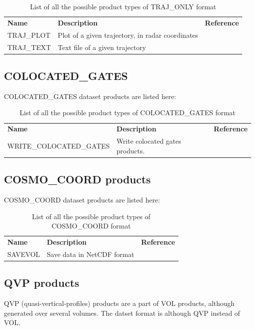 \documentclass[a4paper,11pt,pdftex,twoside]{scrartcl}
\renewcommand{\bf}{\normalfont \bfseries}
\begin{document}
{{{\begin{table}[H]
\begin{tabularx}{\textwidth}{lXl}
{\bf Name} & {\bf Description} & {\bf Reference}\\
 TRAJ\_PLOT & Plot of a given trajectory, in radar coordinates &  \\
 TRAJ\_TEXT & Text file of  a given trajectory &  \\
 

\end{tabularx}
\caption{List of all the possible product types of TRAJ\_ONLY format}
\label{tab_products_TRAJ_ONLY}
\end{table}

\subsection{COLOCATED\_GATES}
COLOCATED\_GATES dataset products are listed here:

\begin{table}[H]
\begin{tabularx}{\textwidth}{lXl}
{\bf Name} & {\bf Description} & {\bf Reference}\\
 WRITE\_COLOCATED\_GATES & Write colocated gates products. &  \\
\end{tabularx}
\caption{List of all the possible product types of COLOCATED\_GATES format}
\label{tab_products_COLOCATED_GATES}
\end{table}



\subsection{COSMO\_COORD products}
COSMO\_COORD dataset products are listed here:

\begin{table}[H]
\begin{tabularx}{\textwidth}{lXl}
{\bf Name} & {\bf Description} & {\bf Reference}\\
 SAVEVOL & Save data in NetCDF format &  \\
\end{tabularx}
\caption{List of all the possible product types of COSMO\_COORD format}
\label{tab_products_COSMO_COORD}
\end{table}


\subsection{QVP products}
QVP (quasi-vertical-profiles) products are a part of VOL products, although generated over several volumes. The datset format is although QVP instead of VOL.

}}}
\end{document}
